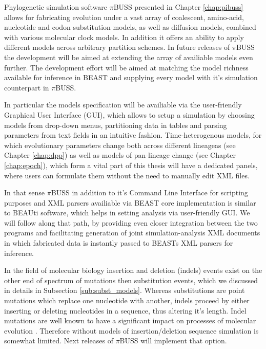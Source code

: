 Phylogenetic simulation software $\pi$BUSS presented in Chapter \ref{chap:pibuss} allows for fabricating evolution under a vast array of coalescent, amino-acid, nucleotide and codon substitution models, as well as diffusion models, combined with various molecular clock models.
In addition it offers an ability to apply different models across arbitrary partition schemes.
In future releases of $\pi$BUSS the development will be aimed at extending the array of availiable models even further.
The development effort will be aimed at matching the model richness available for inference in BEAST and supplying every model with it's simulation counterpart in $\pi$BUSS.

In particular the models specification will be availiable via the user-friendly Graphical User Interface (GUI), which allows to setup a simulation by choosing models from drop-down menus, partitioning data in tables and parsing parameters from text fields in an intuitive fashion.
Time-heterogenous models, for which evolutionary parameters change both across different lineageas (see Chapter \ref{chap:dpp}) as well as models of pan-lineage change (see Chapter \ref{chap:epoch}), which form a vital part of this thesis will have a dedicated panels, where users can formulate them without the need to manually edit XML files.

In that sense $\pi$BUSS in addition to it's Command Line Interface for scripting purposes and XML parsers availiable via BEAST core implementation is similar to BEAUti software, which helps in setting analysis via user-friendly GUI.
We will follow along that path, by providing even closer integration between the two programs and facilitating generation of joint simulation-analysis XML documents in which fabricated data is instantly passed to BEASTs XML parsers for inference.

In the field of molecular biology insertion and deletion (indels) events exist on the other end of spectrum of mutations then substitution events, which we discussed in details in Subsection \ref{sub:subst_models}.
Whereas substitutions are point mutations which replace one nucleotide with another, indels proceed by either inserting or deleting nucleotides in a sequence, thus altering it's length. 
Indel mutations are well known to have a significant impact on processes of molecular evolution \citep{Fletcher2009}.
Therefore without models of insertion/deletion sequence simulation is somewhat limited.
Next releases of $\pi$BUSS will implement that option.

